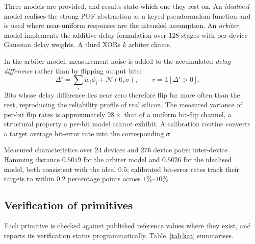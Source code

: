 \documentclass[11pt,a4paper]{article}
\begin{document}
Three models are provided, and results state which one they rest on. An
\emph{idealised} model realises the strong-PUF abstraction as a keyed
pseudorandom function and is used where near-uniform responses are the intended
assumption. An \emph{arbiter} model implements the additive-delay formulation over
128 stages with per-device Gaussian delay weights. A third XORs $k$ arbiter chains.

In the arbiter model, measurement noise is added to the accumulated \emph{delay
difference} rather than by flipping output bits:
%
\begin{equation}
\Delta' = \sum_{i} w_i \phi_i + \mathcal{N}(0,\sigma), \qquad
r = \mathbb{1}[\Delta' > 0].
\end{equation}
%
Bits whose delay difference lies near zero therefore flip far more often than the
rest, reproducing the reliability profile of real silicon. The measured variance of
per-bit flip rates is approximately $98\times$ that of a uniform bit-flip channel,
a structural property a per-bit model cannot exhibit. A calibration routine
converts a target average bit-error rate into the corresponding $\sigma$.

Measured characteristics over 24 devices and 276 device pairs: inter-device Hamming
distance $0.5019$ for the arbiter model and $0.5026$ for the idealised model, both
consistent with the ideal $0.5$; calibrated bit-error rates track their targets to
within $0.2$ percentage points across $1\%$--$10\%$.

\subsection{Verification of primitives}

Each primitive is checked against published reference values where they exist, and
reports its verification status programmatically. Table~\ref{tab:kat} summarises.
\end{document}
